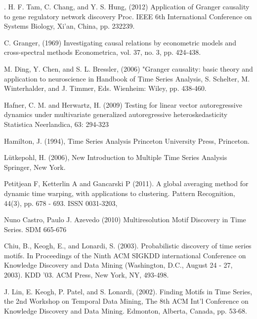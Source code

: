 
\begin{thebibliography}{00}

. H. F. Tam, C. Chang, and Y. S. Hung, (2012)
\newblock Application of Granger causality to gene regulatory network discovery  
\newblock Proc. IEEE 6th International Conference on Systems Biology, Xi'an, China, pp. 232239.

 C. Granger, (1969)
\newblock Investigating causal relations by econometric models and cross-spectral methods
\newblock Econometrica, vol. 37, no. 3, pp. 424-438.

M. Ding, Y. Chen, and S. L. Bressler, (2006)
\newblock "Granger causality: basic theory and application to neuroscience 
\newblock in Handbook of Time Series Analysis, S. Schelter, M. Winterhalder, and J. Timmer, Eds. Wienheim: Wiley, pp. 438-460.

 Hafner, C. M. and Herwartz, H. (2009) 
\newblock Testing for linear vector autoregressive dynamics under multivariate generalized autoregressive heteroskedasticity 
\newblock Statistica Neerlandica, 63: 294-323

Hamilton, J. (1994), 
\newblock Time Series Analysis 
\newblock Princeton University Press, Princeton.

Lütkepohl, H. (2006), 
\newblock New Introduction to Multiple Time Series Analysis
\newblock Springer, New York.

 Petitjean F, Ketterlin A and Gancarski P (2011). 
\newblock  A global averaging method for dynamic time warping, with applications to clustering.
\newblock  Pattern Recognition, 44(3), pp. 678 - 693. ISSN 0031-3203,

 Nuno Castro, Paulo J. Azevedo (2010)
\newblock  Multiresolution Motif Discovery in Time Series. 
\newblock  SDM 665-676 
 
 Chiu, B., Keogh, E., and Lonardi, S. (2003). 
\newblock Probabilistic discovery of time series motifs. 
\newblock In Proceedings of the Ninth ACM SIGKDD international Conference on Knowledge Discovery and Data Mining (Washington, D.C., August 24 - 27, 2003). KDD '03. ACM Press, New York, NY, 493-498.

 J. Lin, E. Keogh, P. Patel, and S. Lonardi, (2002).
\newblock Finding Motifs in Time Series, the 2nd Workshop on Temporal Data Mining, 
\newblock The 8th ACM Int'l Conference on Knowledge Discovery and Data Mining. Edmonton, Alberta, Canada, pp. 53-68. 


\end{thebibliography}
